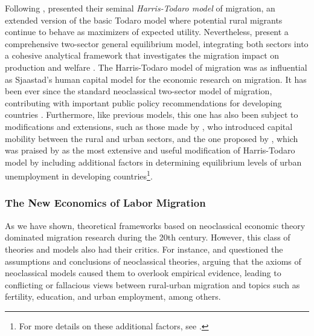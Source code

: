 Following \cite{todaro_model_1969}, \cite{harris_migration_1970} presented their seminal \textit{Harris-Todaro model} of migration, an extended version of the basic Todaro model where potential rural migrants continue to behave as maximizers of expected utility. Nevertheless, \cite{harris_migration_1970} present a comprehensive two-sector general equilibrium model, integrating both sectors into a cohesive analytical framework that investigates the migration impact on production and welfare \citep{harris_migration_1970, easterlin_internal_1980}. The Harris-Todaro model of migration was as influential as Sjaastad's human capital model for the economic research on migration. It has been ever since the standard neoclassical two-sector model of migration, contributing with important public policy recommendations for developing countries \citep{harris_migration_1970, easterlin_internal_1980}. Furthermore, like previous models, this one has also been subject to modifications and extensions, such as those made by \cite{corden_urban_1975}, who introduced capital mobility between the rural and urban sectors, and the one proposed by \cite{fields_rural-urban_1975}, which was praised by \cite{easterlin_internal_1980} as the most extensive and useful modification of Harris-Todaro model by including additional factors in determining equilibrium levels of urban unemployment in developing countries\footnote{For more details on these additional factors, see \citep[p. 375]{easterlin_internal_1980}.}.

\subsubsection{The New Economics of Labor Migration}

As we have shown, theoretical frameworks based on neoclassical economic theory dominated migration research during the 20th century. However, this class of theories and models also had their critics. For instance, \cite{stark_new_1985} and \cite{stark_migration_1991} questioned the assumptions and conclusions of neoclassical theories, arguing that the axioms of neoclassical models caused them to overlook empirical evidence, leading to conflicting or fallacious views between rural-urban migration and topics such as fertility, education, and urban employment, among others.


